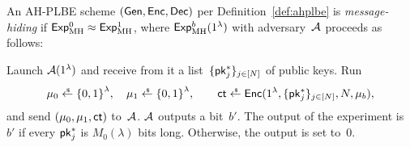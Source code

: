 \begin{definition}\label{def:ahplbe-message-hiding}
An AH-PLBE scheme $(\Gen,\Enc,\Dec)$ per Definition~\ref{def:ahplbe}
is \emph{message-hiding} if ${\ExpMH{0}\approx\ExpMH{1}}$,
where $\ExpMH{b}(1^\lambda)$ with adversary~${\mathcal{A}}$ proceeds as follows:
\begin{security}
Launch ${\mathcal{A}}(1^\lambda)$ and
receive from it a list~$\{\pk^\ast_j\}_{j\in[N]}$ of public keys.
Run
\begin{align*}
\mu_0\draws\bit^\lambda,\quad
\mu_1\draws\bit^\lambda,\qquad
\ct\draws\Enc(1^\lambda,\{\pk^\ast_j\}_{j\in[N]},N,\mu_b),
\end{align*}
and send $(\mu_0,\mu_1,\ct)$ to~${\mathcal{A}}$.
${\mathcal{A}}$ outputs a bit~$b'$.
The output of the experiment is~$b'$
if every $\pk^\ast_j$ is $M_0(\lambda)$ bits long.
Otherwise, the output is set to~$0$.
\end{security}
\end{definition}
